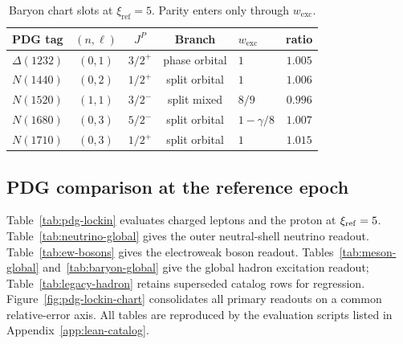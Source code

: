 \documentclass[11pt]{amsart}
\begin{document}
\begin{table}[ht]
  \centering
  \caption{Baryon chart slots at $\xi_{\mathrm{ref}}=5$. Parity enters only through
    $w_{\mathrm{exc}}$.}
  \label{tab:chart-slots}
  \small
  \begin{tabular}{lccclc}
    \toprule
    PDG tag & $(n,\ell)$ & $J^P$ & Branch & $w_{\mathrm{exc}}$ & ratio \\
    \midrule
    $\Delta(1232)$ & $(0,1)$ & $3/2^+$ & phase orbital & $1$ & $1.005$ \\
    $N(1440)$ & $(0,2)$ & $1/2^+$ & split orbital & $1$ & $1.006$ \\
    $N(1520)$ & $(1,1)$ & $3/2^-$ & split mixed & $8/9$ & $0.996$ \\
    $N(1680)$ & $(0,3)$ & $5/2^-$ & split orbital & $1-\gamma/8$ & $1.007$ \\
    $N(1710)$ & $(0,3)$ & $1/2^+$ & split orbital & $1$ & $1.015$ \\
    \bottomrule
  \end{tabular}
\end{table}

\subsection{PDG comparison at the reference epoch}

Table~\ref{tab:pdg-lockin} evaluates charged leptons and the proton at $\xi_{\rm ref}=5$.
Table~\ref{tab:neutrino-global} gives the outer neutral-shell neutrino readout.
Table~\ref{tab:ew-bosons} gives the electroweak boson readout.
Tables~\ref{tab:meson-global} and~\ref{tab:baryon-global} give the global hadron excitation readout; Table~\ref{tab:legacy-hadron} retains superseded catalog rows
for regression. Figure~\ref{fig:pdg-lockin-chart} consolidates all primary readouts on a common relative-error axis. All tables are reproduced by the evaluation scripts listed in Appendix~\ref{app:lean-catalog}.
\end{document}
